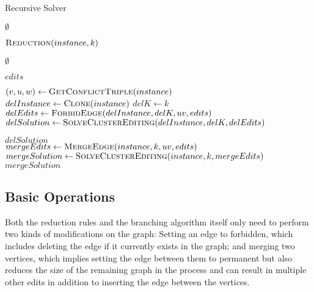 \documentclass{article}
\theoremstyle{definition}
\begin{document}
\begin{algorithm}
\caption{Recursive Solver}
\label{alg:solver}
\begin{algorithmic}

		\State \Return $\emptyset$
	\EndIf

	\State $\Call{Reduction}{instance, k}$

		\State \Return $\emptyset$
	\EndIf

		\State \Return $edits$
	\EndIf

	\State $(v, u, w) \gets \Call{GetConflictTriple}{instance}$
	\\
	\State $delInstance \gets \Call{Clone}{instance}$
	\State $delK \gets k$
	\State $delEdits \gets \Call{ForbidEdge}{delInstance, delK, uv, edits}$
	\State $delSolution \gets \Call{SolveClusterEditing}{delInstance, delK, delEdits}$

		\State \Return $delSolution$
	\EndIf
	\\
	\State $mergeEdits \gets \Call{MergeEdge}{instance, k, uv, edits}$
	\State $mergeSolution \gets \Call{SolveClusterEditing}{instance, k, mergeEdits}$
	\State \Return $mergeSolution$
\EndFunction

\end{algorithmic}
\end{algorithm}

\subsection{Basic Operations}

Both the reduction rules and the branching algorithm itself only need to perform two kinds of
modifications on the graph: Setting an edge to forbidden, which includes deleting the edge if it
currently exists in the graph; and merging two vertices, which implies setting the edge between them
to permanent but also reduces the size of the remaining graph in the process and can result in
multiple other edits in addition to inserting the edge between the vertices.

\end{document}
